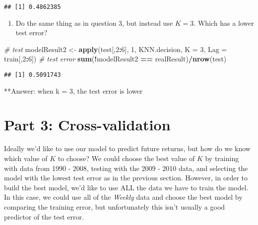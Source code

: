 \documentclass[]{article}
\newenvironment{Shaded}{\begin{snugshade}}{\end{snugshade}}
\newcommand{\CommentTok}[1]{\textcolor[rgb]{0.56,0.35,0.01}{\textit{#1}}}
\newcommand{\DataTypeTok}[1]{\textcolor[rgb]{0.13,0.29,0.53}{#1}}
\newcommand{\DecValTok}[1]{\textcolor[rgb]{0.00,0.00,0.81}{#1}}
\newcommand{\KeywordTok}[1]{\textcolor[rgb]{0.13,0.29,0.53}{\textbf{#1}}}
\newcommand{\NormalTok}[1]{#1}
\newcommand{\OperatorTok}[1]{\textcolor[rgb]{0.81,0.36,0.00}{\textbf{#1}}}
\newcommand{\StringTok}[1]{\textcolor[rgb]{0.31,0.60,0.02}{#1}}
\providecommand{\tightlist}{%
  \setlength{\itemsep}{0pt}\setlength{\parskip}{0pt}}
\begin{document}
\begin{verbatim}
## [1] 0.4862385
\end{verbatim}

\begin{enumerate}
\def\labelenumi{\arabic{enumi}.}
\setcounter{enumi}{3}
\tightlist
\item
  Do the same thing as in question 3, but instead use \(K=3\). Which has
  a lower test error?
\end{enumerate}

\begin{Shaded}
\begin{Highlighting}[]
\CommentTok{# test}
\NormalTok{modelResult2 <-}\StringTok{ }\KeywordTok{apply}\NormalTok{(test[,}\DecValTok{2}\OperatorTok{:}\DecValTok{6}\NormalTok{], }\DecValTok{1}\NormalTok{, KNN.decision, }\DataTypeTok{K =} \DecValTok{3}\NormalTok{, }\DataTypeTok{Lag =}\NormalTok{ train[,}\DecValTok{2}\OperatorTok{:}\DecValTok{6}\NormalTok{])}
\CommentTok{# test error}
\KeywordTok{sum}\NormalTok{(}\OperatorTok{!}\NormalTok{modelResult2 }\OperatorTok{==}\StringTok{ }\NormalTok{realResult)}\OperatorTok{/}\KeywordTok{nrow}\NormalTok{(test)}
\end{Highlighting}
\end{Shaded}

\begin{verbatim}
## [1] 0.5091743
\end{verbatim}

**Answer: when k = 3, the test error is lower

\hypertarget{part-3-cross-validation}{%
\section{Part 3: Cross-validation}\label{part-3-cross-validation}}

Ideally we'd like to use our model to predict future returns, but how do
we know which value of \(K\) to choose? We could choose the best value
of \(K\) by training with data from 1990 - 2008, testing with the 2009 -
2010 data, and selecting the model with the lowest test error as in the
previous section. However, in order to build the best model, we'd like
to use ALL the data we have to train the model. In this case, we could
use all of the \emph{Weekly} data and choose the best model by comparing
the training error, but unfortunately this isn't usually a good
predictor of the test error.
\end{document}
